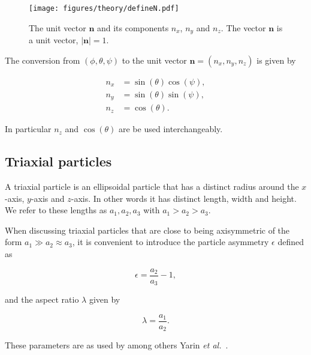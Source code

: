 \begin{figure}[H]
\begin{center}
\texttt{[image: figures/theory/defineN.pdf]}
\end{center}
\caption{The unit vector $\mathbf{n}$ and its components $n_x$, $n_y$ and $n_z$. The vector $\mathbf{n}$ is a unit vector, $|\mathbf{n}| = 1$.}
\label{fig:nDef}
\end{figure}

The conversion from $(\phi, \theta, \psi)$ to the unit vector $\mathbf{n} = (n_x, n_y, n_z)$ is given by 

\begin{subequations}\label{eq:nzEq}
\begin{align}
n_x 	&= \sin(\theta)\cos(\psi), \\
n_y 	&= \sin(\theta)\sin(\psi),\\
n_z		&= \cos(\theta).
\end{align}
\end{subequations}

\noindent In particular $n_z$ and $\cos(\theta)$ are be used interchangeably.

\subsection{Triaxial particles}
A triaxial particle is an ellipsoidal particle that has a distinct radius around the $x$-axis, $y$-axis and $z$-axis. In other words it has distinct length, width and height. We refer to these lengths as $a_1, a_2, a_3$ with $a_1 > a_2 > a_3$.


When discussing triaxial particles that are close to being axisymmetric of the form $a_1 \gg a_2 \approx a_3$, it is convenient to introduce the particle asymmetry $\epsilon$ defined as

\begin{equation}\label{eq:epsilon}
\epsilon = \frac{a_2}{a_3} - 1,
\end{equation}

\noindent and the aspect ratio $\lambda$ given by

\begin{equation}\label{eq:lambda}
\lambda = \frac{a_1}{a_2}.
\end{equation}

These parameters are as used by among others Yarin \emph{et al.}~\cite{Yarin}.



